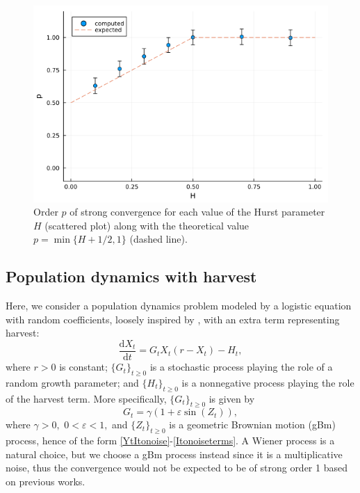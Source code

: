 \documentclass[reqno,12pt]{amsart}
\theoremstyle{plain} %
\theoremstyle{definition} %
\begin{document}
\begin{figure}[htb]
    \includegraphics[scale=0.6]{img/order_dep_on_H_fBm.png}
    \caption{Order $p$ of strong convergence for each value of the Hurst parameter $H$ (scattered plot) along with the theoretical value $p=\min\{H + 1/2, 1\}$ (dashed line).}
    \label{figorderdepHfBm}
\end{figure}

\subsection{Population dynamics with harvest}
\label{secpopdyn}

Here, we consider a population dynamics problem modeled by a logistic equation with random coefficients, loosely inspired by \cite[Section 15.2]{HanKloeden2017}, with an extra term representing harvest:
\begin{equation}
    \label{rodepopulationdynamics}
    \frac{\mathrm{d}X_t}{\mathrm{d}t} = G_t X_t (r - X_t) - H_t,
\end{equation}
where $r > 0$ is constant; $\{G_t\}_{t \geq 0}$ is a stochastic process playing the role of a random growth parameter; and $\{H_t\}_{t\geq 0}$ is a nonnegative process playing the role of the harvest term. More specifically, $\{G_t\}_{t \geq 0}$ is given by
\[
    G_t = \gamma (1 + \varepsilon \sin(Z_t)),
\]
where $\gamma > 0,$ $0 < \varepsilon < 1,$ and $\{Z_t\}_{t\geq 0}$ is a geometric Brownian motion (gBm) process, hence of the form \eqref{YtItonoise}-\eqref{Itonoiseterms}. A Wiener process is a natural choice, but we choose a gBm process instead since it is a multiplicative noise, thus the convergence would not be expected to be of strong order 1 based on previous works.
\end{document}
